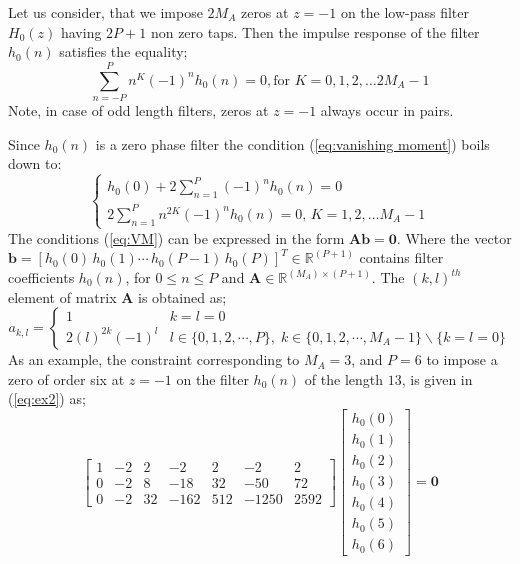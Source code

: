 Let us consider, that we impose $2M_{A}$ zeros at $z=-1$ on the
low-pass filter $H_{0}(z)$ having $2P+1$ non zero taps. Then the
impulse response of the filter $h_{0}(n)$ satisfies the equality;
\begin{equation}
\sum_{n=-P}^{P}n^{K}(-1)^{n}h_{0}(n)=0,\mbox{for }K=0,1,2,\ldots2M_{A}-1\label{eq:vanishing moment}
\end{equation}
Note, in case of odd length filters, zeros at $z=-1$ always occur in
pairs.

Since $h_{0}(n)$ is a zero phase filter the condition (\ref{eq:vanishing moment})
boils down to:
\begin{equation}
\label{eq:VM}
\begin{cases}
h_{0}(0)+2\sum_{n=1}^{P}(-1)^{n}h_{0}(n)=0 \\
2\sum_{n=1}^{P}n^{2K}(-1)^{n}h_{0}(n)=0\mbox{, }K=1,2,\ldots M_{A}-1
\end{cases}
\end{equation}
The conditions (\ref{eq:VM}) can be expressed
in the form $\mathbf{Ab}=\mathbf{0}$. Where the vector $ \mathbf {b} =[h_{0}(0)\, h_{0}(1)\cdots\, h_{0}(P-1)\,h_{0}(P)]^{T}\in\mathbb{R}^{(P+1)}  $
 contains filter coefficients  $h_{0}(n)$,
for $0\leq n\leq P$ and $ \mathbf{A}\in\mathbb{R}^{(M_{A})\times(P+1)}  $. The $(k,l)^{th}$ element of matrix $\mathbf{A}$ is obtained as;
\begin{equation}
\label{eq:MatrixA}
a_{k,l}=\begin{cases}
1 & k=l=0\\
2(l)^{2k}(-1)^{l} & l\in\{0,1,2,\cdots, P\},\;k\in\{0,1,2,\cdots, M_{A}-1\}\backslash\{k=l=0\}
\end{cases}
\end{equation}
As an example, the constraint corresponding to  $M_{A}=3$, and $P=6$ to impose a zero of order six at $z=-1$ on the filter $ h_{0}(n) $ of the length $13$,  is given in (\ref{eq:ex2}) as;
\begin{equation}
\label{eq:ex2}
\left[\begin{array}{ccccccc}
1 & -2 & 2 & -2 & 2 & -2 & 2\\
0 & -2 & 8 & -18 & 32 & -50 & 72\\
0 & -2 & 32 & -162 & 512 & -1250 & 2592
\end{array}\right]\left[\begin{array}{c}
h_{0}(0)\\
h_{0}(1)\\
h_{0}(2)\\
h_{0}(3)\\
h_{0}(4)\\
h_{0}(5)\\
h_{0}(6)
\end{array}\right]=\mathbf{0}
\end{equation}

